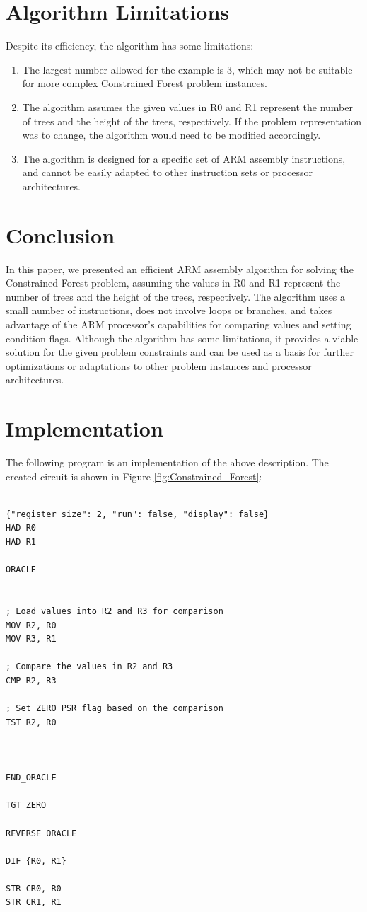 \section{Algorithm Limitations}
Despite its efficiency, the algorithm has some limitations:

\begin{enumerate}
    \item The largest number allowed for the example is 3, which may not be suitable for more complex Constrained Forest problem instances.
    \item The algorithm assumes the given values in R0 and R1 represent the number of trees and the height of the trees, respectively. If the problem representation was to change, the algorithm would need to be modified accordingly.
    \item The algorithm is designed for a specific set of ARM assembly instructions, and cannot be easily adapted to other instruction sets or processor architectures.
\end{enumerate}

\section{Conclusion}
In this paper, we presented an efficient ARM assembly algorithm for solving the Constrained Forest problem, assuming the values in R0 and R1 represent the number of trees and the height of the trees, respectively. The algorithm uses a small number of instructions, does not involve loops or branches, and takes advantage of the ARM processor's capabilities for comparing values and setting condition flags. Although the algorithm has some limitations, it provides a viable solution for the given problem constraints and can be used as a basis for further optimizations or adaptations to other problem instances and processor architectures.



\section{Implementation}

The following program is an implementation of the above description. The created circuit is shown in Figure \ref{fig:Constrained_Forest}:

\begin{lstlisting}

{"register_size": 2, "run": false, "display": false}
HAD R0
HAD R1

ORACLE


; Load values into R2 and R3 for comparison
MOV R2, R0
MOV R3, R1

; Compare the values in R2 and R3
CMP R2, R3

; Set ZERO PSR flag based on the comparison
TST R2, R0



END_ORACLE

TGT ZERO

REVERSE_ORACLE

DIF {R0, R1}

STR CR0, R0
STR CR1, R1


\end{lstlisting}

